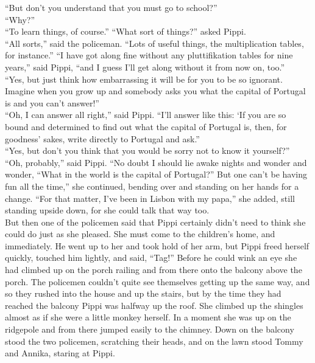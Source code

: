 \documentclass{standard}
\begin{document}
“But don’t you understand that you must go to school?”\\

“Why?”\\

“To learn things, of course.” “What sort of things?” asked Pippi.\\

“All sorts,” said the policeman. “Lots of useful things, the multiplication tables, for instance.”
“I have got along fine without any pluttifikation tables for nine years,” said Pippi, “and I guess I’ll get along without it from now on, too.”\\

“Yes, but just think how embarrassing it will be for you to be so ignorant. Imagine when you grow up and somebody asks you what the capital of Portugal is and you can’t answer!”\\

“Oh, I can answer all right,” said Pippi. “I’ll answer like this: ‘If you are so bound and determined to find out what the capital of Portugal is, then, for goodness’ sakes, write directly to Portugal and ask.”\\

“Yes, but don’t you think that you would be sorry not to know it yourself?”\\

“Oh, probably,” said Pippi. “No doubt I should lie awake nights and wonder and wonder, “What in the world is the capital of Portugal?” But one can’t be having fun all the time,” she continued, bending over and standing on her hands for a change. “For that matter, I’ve been in Lisbon with my papa,” she added, still standing upside down, for she could talk that way too.\\

But then one of the policemen said that Pippi certainly didn’t need to think she could do just as she pleased. She must come to the children’s home, and immediately. He went up to her and took hold of her arm, but Pippi freed herself quickly, touched him lightly, and said, “Tag!” Before he could wink an eye she had climbed up on the porch railing and from there onto the balcony above the porch. The policemen couldn’t quite see themselves getting up the same way, and so they rushed into the house and up the stairs, but by the time they had reached the balcony Pippi was halfway up the roof. She climbed up the shingles almost as if she were a little monkey herself. In a moment she was up on the ridgepole and from there jumped easily to the chimney. Down on the balcony stood the two policemen, scratching their heads, and on the lawn stood Tommy and Annika, staring at Pippi.\\
\end{document}
